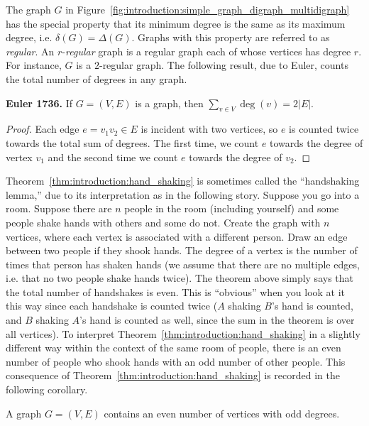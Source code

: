 The graph $G$ in
Figure~\ref{fig:introduction:simple_graph_digraph_multidigraph}
has the special property that its minimum degree is the same as its
maximum degree, i.e. $\delta(G) = \Delta(G)$. Graphs with this
property are referred to as \emph{regular}. An $r$-\emph{regular}
graph is a regular graph each of whose vertices has degree $r$. For
instance, $G$ is a $2$-regular graph. The following result, due to
Euler, counts the total number of degrees in any graph.

\begin{theorem}
\label{thm:introduction:degree_sum}
\label{thm:introduction:hand_shaking}
\textbf{Euler 1736.}
If $G = (V, E)$ is a graph, then $\sum_{v \in V} \deg(v) = 2 |E|$.
\end{theorem}

\begin{proof}
Each edge $e = v_1 v_2 \in E$ is incident with two vertices, so $e$ is
counted twice towards the total sum of degrees. The first time, we
count $e$ towards the degree of vertex $v_1$ and the second time we
count $e$ towards the degree of $v_2$.
\end{proof}

Theorem~\ref{thm:introduction:hand_shaking} is sometimes called the
``handshaking lemma,'' due to its interpretation as in the following
story. Suppose you go into a room. Suppose there are $n$ people in the
room (including yourself) and some people shake hands with others and
some do not. Create the graph with $n$ vertices, where each vertex is
associated with a different person. Draw an edge between two people if
they shook hands. The degree of a vertex is the number of times that
person has shaken hands (we assume that there are no multiple edges,
i.e. that no two people shake hands twice). The theorem above simply
says that the total number of handshakes is even. This is ``obvious''
when you look at it this way since each handshake is counted twice
($A$ shaking $B$'s hand is counted, and $B$ shaking $A$'s hand is
counted as well, since the sum in the theorem is over all
vertices). To interpret Theorem~\ref{thm:introduction:hand_shaking} in
a slightly different way within the context of the same room of
people, there is an even number of people who shook hands with an odd
number of other people. This consequence of
Theorem~\ref{thm:introduction:hand_shaking} is recorded in the
following corollary.

\begin{corollary}
\label{cor:introduction:even_num_vertices_odd_degree}
A graph $G = (V, E)$ contains an even number of vertices with odd
degrees.
\end{corollary}

